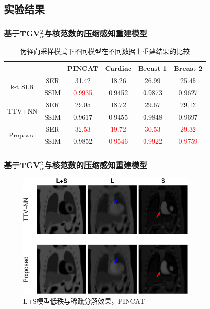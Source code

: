 \documentclass{beamer}
\begin{document}
\subsection{实验结果}
\begin{frame}
	\frametitle{基于TGV$_\alpha^2$与核范数的压缩感知重建模型}
	\begin{table}
	\center{}
	\caption{伪径向采样模式下不同模型在不同数据上重建结果的比较}
	\begin{tabular}{|c|c|c|c|c|c|}
		\hline
		\multicolumn{2}{|c|}{\diagbox{Models}{Datesets}}& PINCAT & Cardiac & Breast 1 & Breast 2\\	
		\hline
		\multirow{2}{*}{k-t SLR}
		&SER & 31.42 & 18.26 & 26.99 & 25.45\\
		\cline{2-6}&SSIM & \textcolor{red}{0.9935} & 0.9452 & 0.9873 & 0.9627\\
		\hline
		\multirow{2}{*}{TTV+NN}
		&SER & 29.05 & 18.72 & 29.67 & 29.12\\
		\cline{2-6}&SSIM & 0.9617 & 0.9455 & 0.9848 & 0.9697\\
		\hline
		\multirow{2}{*}{Proposed}
		&SER & \textcolor{red}{32.53} & \textcolor{red}{19.72} & \textcolor{red}{30.53} & \textcolor{red}{29.32}\\
		\cline{2-6}&SSIM & 0.9852 & \textcolor{red}{0.9546} & \textcolor{red}{0.9922} & \textcolor{red}{0.9759}\\
		\hline
	\end{tabular}
\end{table}
\end{frame}

\begin{frame}
	\frametitle{基于TGV$_\alpha^2$与核范数的压缩感知重建模型}
	\begin{figure}[htbp]
	\centering
		\includegraphics[width=0.8\textwidth]{../img/tgvnn/pincat_1_l+s.eps}
	\caption{L+S模型低秩与稀疏分解效果。PINCAT}
\end{figure}
\end{frame}
\end{document}
